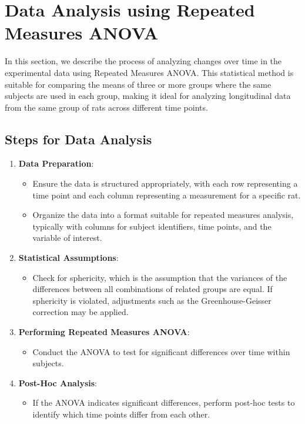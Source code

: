 \documentclass[english, a4paper, 11pt]{article}
\begin{document}
\section*{Data Analysis using Repeated Measures ANOVA}

In this section, we describe the process of analyzing changes over time in the experimental data using Repeated Measures ANOVA. This statistical method is suitable for comparing the means of three or more groups where the same subjects are used in each group, making it ideal for analyzing longitudinal data from the same group of rats across different time points.

\subsection*{Steps for Data Analysis}

\begin{enumerate}
    \item \textbf{Data Preparation}:
          \begin{itemize}
              \item Ensure the data is structured appropriately, with each row representing a time point and each column representing a measurement for a specific rat.
              \item Organize the data into a format suitable for repeated measures analysis, typically with columns for subject identifiers, time points, and the variable of interest.
          \end{itemize}
    \item \textbf{Statistical Assumptions}:
          \begin{itemize}
              \item Check for sphericity, which is the assumption that the variances of the differences between all combinations of related groups are equal. If sphericity is violated, adjustments such as the Greenhouse-Geisser correction may be applied.
          \end{itemize}
    \item \textbf{Performing Repeated Measures ANOVA}:
          \begin{itemize}
              \item Conduct the ANOVA to test for significant differences over time within subjects.
          \end{itemize}
    \item \textbf{Post-Hoc Analysis}:
          \begin{itemize}
              \item If the ANOVA indicates significant differences, perform post-hoc tests to identify which time points differ from each other.
          \end{itemize}
\end{enumerate}
\end{document}
